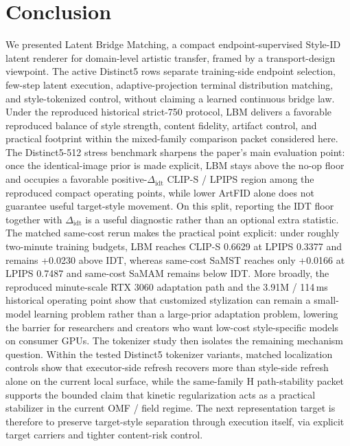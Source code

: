 \documentclass[letterpaper]{article}
\begin{document}
\section{Conclusion}
We presented Latent Bridge Matching, a compact endpoint-supervised Style-ID latent renderer for domain-level artistic transfer, framed by a transport-design viewpoint. The active Distinct5 rows separate training-side endpoint selection, few-step latent execution, adaptive-projection terminal distribution matching, and style-tokenized control, without claiming a learned continuous bridge law. Under the reproduced historical strict-750 protocol, LBM delivers a favorable reproduced balance of style strength, content fidelity, artifact control, and practical footprint within the mixed-family comparison packet considered here. The Distinct5-512 stress benchmark sharpens the paper's main evaluation point: once the identical-image prior is made explicit, LBM stays above the no-op floor and occupies a favorable positive-$\Delta_{\mathrm{idt}}$ CLIP-S / LPIPS region among the reproduced compact operating points, while lower ArtFID alone does not guarantee useful target-style movement. On this split, reporting the IDT floor together with $\Delta_{\mathrm{idt}}$ is a useful diagnostic rather than an optional extra statistic. The matched same-cost rerun makes the practical point explicit: under roughly two-minute training budgets, LBM reaches CLIP-S 0.6629 at LPIPS 0.3377 and remains +0.0230 above IDT, whereas same-cost SaMST reaches only +0.0166 at LPIPS 0.7487 and same-cost SaMAM remains below IDT. More broadly, the reproduced minute-scale RTX 3060 adaptation path and the 3.91M / 114\,ms historical operating point show that customized stylization can remain a small-model learning problem rather than a large-prior adaptation problem, lowering the barrier for researchers and creators who want low-cost style-specific models on consumer GPUs. The tokenizer study then isolates the remaining mechanism question. Within the tested Distinct5 tokenizer variants, matched localization controls show that executor-side refresh recovers more than style-side refresh alone on the current local surface, while the same-family H path-stability packet supports the bounded claim that kinetic regularization acts as a practical stabilizer in the current OMF / field regime. The next representation target is therefore to preserve target-style separation through execution itself, via explicit target carriers and tighter content-risk control.


\end{document}
